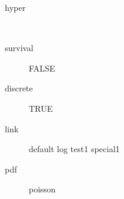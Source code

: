\begin{description}
	\item[hyper]\ 
	\item[survival] FALSE
	\item[discrete] TRUE
	\item[link] default log test1 special1
	\item[pdf] poisson
\end{description}
